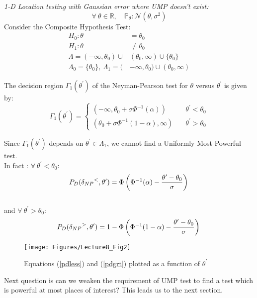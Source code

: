 \documentclass[12pt]{report}
\begin{document}
\begin{exmp}
\emph{1-D Location testing with Gaussian error where UMP doesn't exist:}\\
\[\forall\ \theta \in \mathbb{R}, \quad \mathbb{P}_\theta : \mathcal{N}(\theta, \sigma^2)\]
\noindent Consider the Composite Hypothesis Test:
\begin{align*}
H_0:\theta &= \theta_0 \\
H_1:\theta &\neq \theta_0 \\
\Lambda = (-\infty,\theta_0)\cup&(\theta_0,\infty)\cup\{\theta_0\}\\
\Lambda_0 = \{\theta_0\} , \ \Lambda_1 = (&-\infty, \theta_0) \cup (\theta_0, \infty)
\end{align*}



\noindent The decision region $\Gamma_1(\theta^\prime)$ of the Neyman-Pearson test for $\theta$ versus $\theta^\prime$ is given by:
\begin{equation}
    \Gamma_1(\theta^\prime)=
    \begin{cases}
    (-\infty, \theta_0 + \sigma\Phi^{-1}(\alpha)) &\quad\theta^\prime < \theta_0\\
    (\theta_0 + \sigma\Phi^{-1}(1-\alpha), \infty) &\quad\theta^\prime > \theta_0
    \end{cases}
\end{equation}


\noindent Since $\Gamma_1(\theta^\prime)$ depends on $\theta^\prime\in\Lambda_1$, we cannot find a Uniformly Most Powerful test.\\
In fact : $\forall\ \theta^\prime < \theta_0$:
\begin{equation}
P_D({\delta_{NP}}^{<},\theta^\prime)=\Phi\left(\Phi^{-1}(\alpha)-\frac{\theta^\prime-\theta_0}{\sigma}\right) \label{pdless} \\
\end{equation}
\\and $\forall\ \theta^\prime>\theta_0$: \\
\begin{equation}
P_D({\delta_{NP}}^{>},\theta^\prime)=1-\Phi\left(\Phi^{-1}(1-\alpha)-\frac{\theta^\prime-\theta_0}{\sigma}\right) \label{pdgrt}\\
\end{equation}

\begin{figure}[h]
\centering
\texttt{[image: Figures/Lecture8\_Fig2]}
\caption{Equations (\ref{pdless}) and (\ref{pdgrt}) plotted as a function of $\theta^\prime$ }
\label{UMPtestFail}
\end{figure}

\end{exmp}
\noindent Next question is can we weaken the requirement of UMP test to find a test which is powerful at most places of interest? This leads us to the next section.
\end{document}
